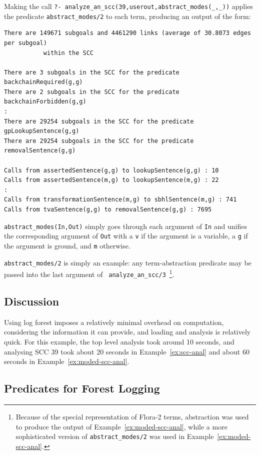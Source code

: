 \begin{example} \label{ex:moded-scc-anal} \rm
%
Making the call {\tt ?-
  analyze\_an\_scc(39,userout,abstract\_modes(\_,\_))} applies the
predicate {\tt abstract\_modes/2} to each term, producing an output of
the form:
%
\begin{verbatim}
There are 149671 subgoals and 4461290 links (average of 30.8073 edges per subgoal) 
           within the SCC

There are 3 subgoals in the SCC for the predicate backchainRequired(g,g)
There are 2 subgoals in the SCC for the predicate backchainForbidden(g,g)
:
There are 29254 subgoals in the SCC for the predicate gpLookupSentence(g,g)
There are 29254 subgoals in the SCC for the predicate removalSentence(g,g)

Calls from assertedSentence(g,g) to lookupSentence(g,g) : 10
Calls from assertedSentence(m,g) to lookupSentence(m,g) : 22
:
Calls from transformationSentence(m,g) to sbhlSentence(m,g) : 741
Calls from tvaSentence(g,g) to removalSentence(g,g) : 7695
\end{verbatim}
%
{\tt abstract\_modes(In,Out)} simply goes through each argument of
{\tt In} and unifies the corresponding argument of {\tt Out} with a
{\tt v} if the argument is a variable, a {\tt g} if the argument is
ground, and {\tt m} otherwise.  
\end{example}
%
{\tt abstract\_modes/2} is simply an example: any term-abstraction
predicate may be passed into the last argument of {\tt
  analyze\_an\_scc/3}~\footnote{Because of the special representation
  of Flora-2 terms, abstraction was used to produce the output of
  Example~\ref{ex:moded-scc-anal}, while a more sophisticated version
  of {\tt abstract\_modes/2} was used in
  Example~\ref{ex:moded-scc-anal}.}.

\subsection{Discussion}
%
Using log forest imposes a relatively minimal overhead on computation,
considering the information it can provide, and loading and analysis
is relatively quick.  For this example, the top level analysis took
around 10 seconds, and analysing SCC 39 took about 20 seconds in
Example~\ref{ex:scc-anal} and about 60 seconds in
Example~\ref{ex:moded-scc-anal}.  

\subsection{Predicates for Forest Logging}

